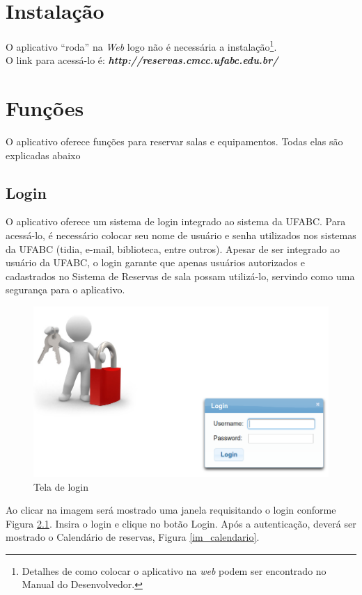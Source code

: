 \documentclass[openany,10pt,a4paper]{book}
\begin{document}
\chapter{Instalação}
O aplicativo ``roda'' na \textit{Web} logo não é necessária a instalação\footnote{Detalhes de como colocar o aplicativo na \textit{web} podem ser encontrado no Manual do Desenvolvedor.}.\\ O link para acessá-lo é: \textbf{\textit{http://reservas.cmcc.ufabc.edu.br/}}

\chapter{Funções}
O aplicativo oferece funções para reservar salas e equipamentos. Todas elas são explicadas abaixo

\section{Login}
O aplicativo oferece um sistema de login integrado ao sistema da UFABC. Para acessá-lo, é necessário colocar seu nome de usuário e senha utilizados nos sistemas da UFABC (tidia, e-mail, biblioteca, entre outros). Apesar de ser integrado ao usuário da UFABC, o login garante que apenas usuários autorizados e cadastrados no Sistema de Reservas de sala possam utilizá-lo, servindo como uma segurança para o aplicativo.

\begin{figure}[!htb]
    \centering
    \includegraphics[scale=0.4]{login.png}
    \caption{Tela de login}
    \label{im_Login}
\end{figure}

Ao clicar na imagem será mostrado uma janela requisitando o login conforme Figura \ref{im_Login}. Insira o login e clique no botão Login. Após a autenticação, deverá ser mostrado o Calendário de reservas, Figura \ref{im_calendario}.
 
\end{document}
